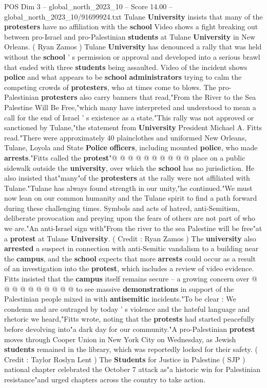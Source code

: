 \begin{textsample}{POS Dim 3 – global\_north\_2023\_10 – Score 14.00 – global\_north\_2023\_10/91699924.txt}  \label{ex:f3_pos_270}
Tulane \textbf{University} insists that many of the \textbf{protesters} have no affiliation with the \textbf{school} Video shows a fight breaking out between pro-Israel and pro-Palestinian \textbf{students} at Tulane \textbf{University} in New Orleans. ( Ryan Zamos ) Tulane \textbf{University} has denounced a rally that was held without the \textbf{school} ' s permission or approval and developed into a serious brawl that ended with three \textbf{students} being assaulted.
Video of the incident shows \textbf{police} and what appears to be \textbf{school} \textbf{administrators} trying to calm the competing crowds of \textbf{protesters}, who at times come to blows.
The pro-Palestinian \textbf{protesters} also carry banners that read,"From the River to the Sea Palestine Will Be Free,"which many have interpreted and understood to mean a call for the end of Israel ' s existence as a state."This rally was not approved or sanctioned by Tulane,"the statement from \textbf{University} President Michael A.
Fitts read."There were approximately 40 plainclothes and uniformed New Orleans, Tulane, Loyola and State \textbf{Police} \textbf{officers}, including mounted \textbf{police}, who made \textbf{arrests}."Fitts called the \textbf{protest}"@ @ @ @ @ @ @ @ @ @ place on a public sidewalk outside the \textbf{university}, over which the \textbf{school} has no jurisdiction.
He also insisted that"many"of the \textbf{protesters} at the rally were not affiliated with Tulane."Tulane has always found strength in our unity,"he continued."We must now lean on our common humanity and the Tulane spirit to find a path forward during these challenging times.
Symbols and acts of hatred, anti-Semitism, deliberate provocation and preying upon the fears of others are not part of who we are."An anti-Israel sign with"From the river to the sea Palestine will be free"at a \textbf{protest} at Tulane \textbf{University}. ( Credit : Ryan Zamos ) The \textbf{university} also \textbf{arrested} a suspect in connection with anti-Semitic vandalism to a building near the \textbf{campus}, and the \textbf{school} expects that more \textbf{arrests} could occur as a result of an investigation into the \textbf{protest}, which includes a review of video evidence.
Fitts insisted that the \textbf{campus} itself remains secure -- a growing concern over @ @ @ @ @ @ @ @ @ @ to see massive \textbf{demonstrations} in support of the Palestinian people mixed in with \textbf{antisemitic} incidents."To be clear : We condemn and are outraged by today ' s violence and the hateful language and rhetoric we heard,"Fitts wrote, noting that the \textbf{protests} had started peacefully before devolving into"a dark day for our community."A pro-Palestinian \textbf{protest} moves through Cooper Union in New York City on Wednesday, as Jewish \textbf{students} remained in the library, which was reportedly locked for their safety. ( Credit : Taylor Roslyn Lent ) The \textbf{Students} for Justice in Palestine ( SJP ) national chapter celebrated the October 7 attack as"a historic win for Palestinian resistance"and urged chapters across the country to take action.

\end{textsample}
